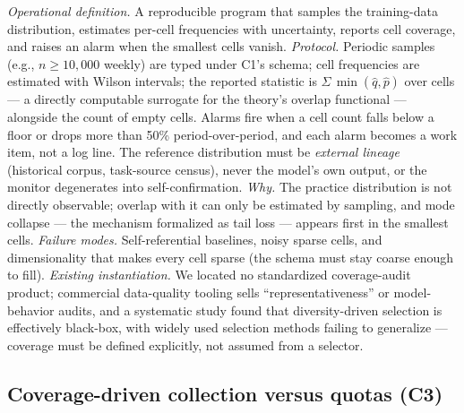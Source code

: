 \documentclass[10pt]{article}
\begin{document}
\emph{Operational definition.} A reproducible program that samples the training-data distribution, estimates per-cell frequencies with uncertainty, reports cell coverage, and raises an alarm when the smallest cells vanish. \emph{Protocol.} Periodic samples (e.g., $n \ge 10{,}000$ weekly) are typed under C1's schema; cell frequencies are estimated with Wilson intervals; the reported statistic is $\Sigma\,\min(\hat{q},\hat{p})$ over cells --- a directly computable surrogate for the theory's overlap functional --- alongside the count of empty cells. Alarms fire when a cell count falls below a floor or drops more than 50\% period-over-period, and each alarm becomes a work item, not a log line. The reference distribution must be \emph{external lineage} (historical corpus, task-source census), never the model's own output, or the monitor degenerates into self-confirmation. \emph{Why.} The practice distribution is not directly observable; overlap with it can only be estimated by sampling, and mode collapse --- the mechanism formalized as tail loss \cite{ref4} --- appears first in the smallest cells. \emph{Failure modes.} Self-referential baselines, noisy sparse cells, and dimensionality that makes every cell sparse (the schema must stay coarse enough to fill). \emph{Existing instantiation.} We located no standardized coverage-audit product; commercial data-quality tooling sells ``representativeness'' or model-behavior audits, and a systematic study found that diversity-driven selection is effectively black-box, with widely used selection methods failing to generalize \cite{ref13} --- coverage must be defined explicitly, not assumed from a selector.

\subsection{Coverage-driven collection versus quotas (C3)}
\end{document}
